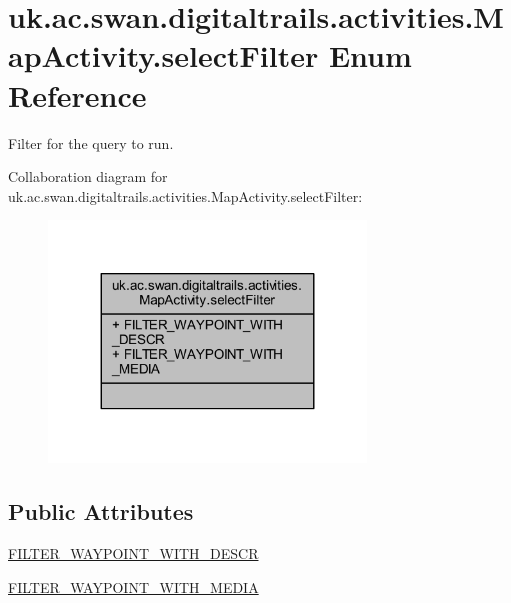 \hypertarget{enumuk_1_1ac_1_1swan_1_1digitaltrails_1_1activities_1_1_map_activity_1_1select_filter}{\section{uk.\+ac.\+swan.\+digitaltrails.\+activities.\+Map\+Activity.\+select\+Filter Enum Reference}
\label{enumuk_1_1ac_1_1swan_1_1digitaltrails_1_1activities_1_1_map_activity_1_1select_filter}
}


Filter for the query to run.  




Collaboration diagram for uk.\+ac.\+swan.\+digitaltrails.\+activities.\+Map\+Activity.\+select\+Filter\+:
\nopagebreak
\begin{figure}[H]
\begin{center}
\leavevmode
\includegraphics[width=239pt]{enumuk_1_1ac_1_1swan_1_1digitaltrails_1_1activities_1_1_map_activity_1_1select_filter__coll__graph}
\end{center}
\end{figure}
\subsection*{Public Attributes}
\begin{DoxyCompactItemize}
\item 
\hyperlink{enumuk_1_1ac_1_1swan_1_1digitaltrails_1_1activities_1_1_map_activity_1_1select_filter_a5ebbb6c810d2587228b6d5d5dbaee624}{F\+I\+L\+T\+E\+R\+\_\+\+W\+A\+Y\+P\+O\+I\+N\+T\+\_\+\+W\+I\+T\+H\+\_\+\+D\+E\+S\+C\+R}
\item 
\hyperlink{enumuk_1_1ac_1_1swan_1_1digitaltrails_1_1activities_1_1_map_activity_1_1select_filter_ad7d212415b9ac504eefd2278a392c9eb}{F\+I\+L\+T\+E\+R\+\_\+\+W\+A\+Y\+P\+O\+I\+N\+T\+\_\+\+W\+I\+T\+H\+\_\+\+M\+E\+D\+I\+A}
\end{DoxyCompactItemize}


